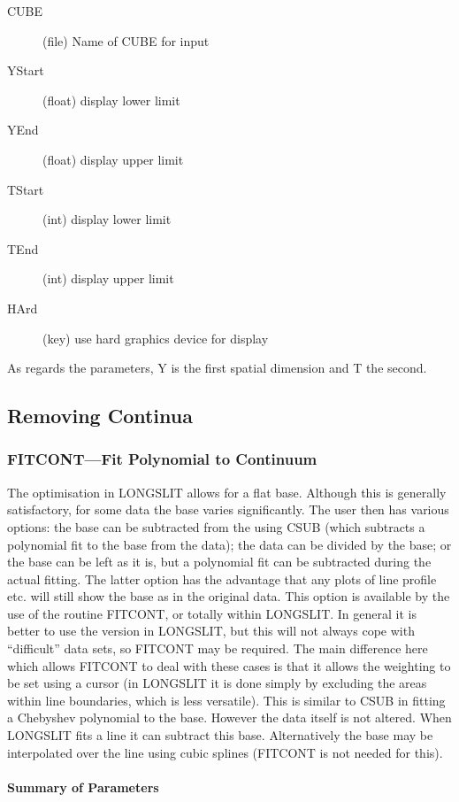 \begin{description}
\item[CUBE] (file) Name of CUBE for input
\item[YStart] (float) display lower limit
\item[YEnd] (float) display upper limit
\item[TStart] (int) display lower limit
\item[TEnd] (int) display upper limit
\item[HArd] (key) use hard graphics device for display
\end{description}
As regards the parameters, Y is the first spatial dimension and T the
second.

\subsection{\label{removing_continua}Removing Continua}
\subsubsection{FITCONT---Fit Polynomial to Continuum}

The optimisation in LONGSLIT allows for a flat base.
Although this is generally satisfactory, for some data the base varies
significantly.
The user then has various options: the base can be subtracted from the
using CSUB (which subtracts a polynomial fit to the base from the
data); the data can be divided by the base; or the base can be left as
it is, but a polynomial fit can be subtracted during the actual fitting.
The latter option has the advantage that any plots of line profile etc.
will still show the base as in the original data.
This option is available by the use of the routine FITCONT, or totally
within LONGSLIT.
In general it is better to use the version in LONGSLIT, but this will
not always cope with ``difficult'' data sets, so FITCONT may be
required.
The main difference here which allows FITCONT to deal with these cases
is that it allows the weighting to be set using a cursor (in LONGSLIT it
is done simply by excluding the areas within line boundaries, which is
less versatile).
This is similar to CSUB in fitting a Chebyshev polynomial to the base.
However the data itself is not altered.
When LONGSLIT fits a line it can subtract this base.
Alternatively the base may be interpolated over the line using cubic
splines (FITCONT is not needed for this).

\paragraph{Summary of Parameters}


